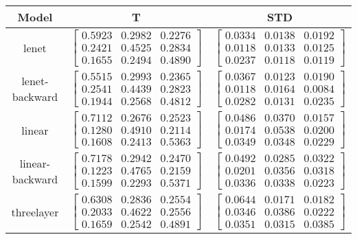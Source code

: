 \documentclass{article} %
\begin{document}
\begin{table}\begin{tabular}{ccc}Model&T&STD\\\hline
lenet & $\begin{bmatrix}0.5923 & 0.2982 & 0.2276\\0.2421 & 0.4525 & 0.2834\\0.1655 & 0.2494 & 0.4890\end{bmatrix}$ & $\begin{bmatrix}0.0334 & 0.0138 & 0.0192\\0.0118 & 0.0133 & 0.0125\\0.0237 & 0.0118 & 0.0119\end{bmatrix}$\\
lenet-backward & $\begin{bmatrix}0.5515 & 0.2993 & 0.2365\\0.2541 & 0.4439 & 0.2823\\0.1944 & 0.2568 & 0.4812\end{bmatrix}$ & $\begin{bmatrix}0.0367 & 0.0123 & 0.0190\\0.0118 & 0.0164 & 0.0084\\0.0282 & 0.0131 & 0.0235\end{bmatrix}$\\
linear & $\begin{bmatrix}0.7112 & 0.2676 & 0.2523\\0.1280 & 0.4910 & 0.2114\\0.1608 & 0.2413 & 0.5363\end{bmatrix}$ & $\begin{bmatrix}0.0486 & 0.0370 & 0.0157\\0.0174 & 0.0538 & 0.0200\\0.0349 & 0.0348 & 0.0229\end{bmatrix}$\\
linear-backward & $\begin{bmatrix}0.7178 & 0.2942 & 0.2470\\0.1223 & 0.4765 & 0.2159\\0.1599 & 0.2293 & 0.5371\end{bmatrix}$ & $\begin{bmatrix}0.0492 & 0.0285 & 0.0322\\0.0201 & 0.0356 & 0.0318\\0.0336 & 0.0338 & 0.0223\end{bmatrix}$\\
threelayer & $\begin{bmatrix}0.6308 & 0.2836 & 0.2554\\0.2033 & 0.4622 & 0.2556\\0.1659 & 0.2542 & 0.4891\end{bmatrix}$ & $\begin{bmatrix}0.0644 & 0.0171 & 0.0182\\0.0346 & 0.0386 & 0.0222\\0.0351 & 0.0315 & 0.0385\end{bmatrix}$\\

\end{tabular}
\end{table}
\end{document}

